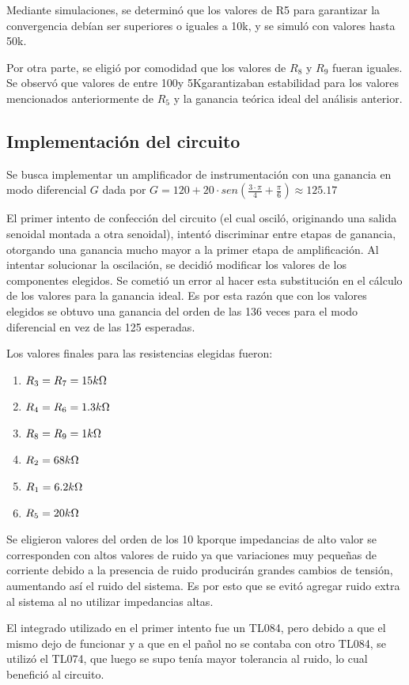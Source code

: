 \documentclass[../../tc_tp3_main.tex]{subfiles}
\begin{document}
Mediante simulaciones, se determinó que los valores de R5 para garantizar la convergencia debían ser superiores o iguales a 10k\ohm, y se simuló con valores hasta 50k\ohm.\par
Por otra parte, se eligió por comodidad que los valores de $R_8$ y $R_9$ fueran iguales. Se observó que valores de entre 100\ohm y 5K\ohm garantizaban estabilidad para los valores mencionados anteriormente de $R_5$ y la ganancia teórica ideal del análisis anterior.\par


\subsection{Implementación del circuito}

Se busca implementar un amplificador de instrumentación con una ganancia en modo diferencial $G$ dada por 
$G = 120 + 20\cdot sen(\frac{3\cdot\pi}{4}+\frac{\pi}{6}) \approx 125.17$\par

El primer intento de confección del circuito (el cual osciló, originando una salida senoidal montada a otra senoidal), intentó discriminar entre etapas de ganancia, otorgando una ganancia mucho mayor a la primer etapa de amplificación. Al intentar solucionar la oscilación, se decidió modificar los valores de los componentes elegidos. Se cometió un error al hacer esta substitución en el cálculo de los valores para la ganancia ideal. Es por esta razón que con los valores elegidos se obtuvo una ganancia del orden de las 136 veces para el modo diferencial en vez de las 125 esperadas. \par

Los valores finales para las resistencias elegidas fueron:\par

\begin{enumerate}
	\item $R_3 = R_7 = 15k\ohm$
	\item $R_4 = R_6 = 1.3k\ohm$
	\item $R_8 = R_9 = 1k\ohm$
	\item $R_2 = 68k\ohm$
	\item $R_1 = 6.2k\ohm$
	\item $R_5 = 20k\ohm$ 
\end{enumerate}

Se eligieron valores del orden de los 10 k\ohm porque impedancias de alto valor se corresponden con altos valores de ruido ya que variaciones muy pequeñas de corriente debido a la presencia de ruido producirán grandes cambios de tensión, aumentando así el ruido del sistema. Es por esto que se evitó agregar ruido extra al sistema al no utilizar impedancias altas.\par
El integrado utilizado en el primer intento fue un TL084, pero debido a que el mismo dejo de funcionar y a que en el pañol no se contaba con otro TL084, se utilizó el TL074, que luego se supo tenía mayor tolerancia al ruido, lo cual benefició al circuito.
\end{document}
